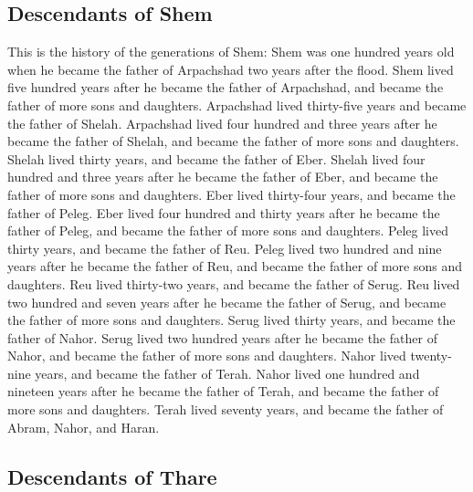 \hypertarget{descendants-of-shem}{%
\subsection{Descendants of Shem}\label{descendants-of-shem}}

 This is the history of the generations of Shem: Shem was
one hundred years old when he became the father of Arpachshad two years
after the flood.  Shem lived five hundred years after he
became the father of Arpachshad, and became the father of more sons and
daughters.  Arpachshad lived thirty-five years and became
the father of Shelah.  Arpachshad lived four hundred and
three years after he became the father of Shelah, and became the father
of more sons and daughters.  Shelah lived thirty years,
and became the father of Eber.  Shelah lived four hundred
and three years after he became the father of Eber, and became the
father of more sons and daughters.  Eber lived
thirty-four years, and became the father of Peleg.  Eber
lived four hundred and thirty years after he became the father of Peleg,
and became the father of more sons and daughters.  Peleg
lived thirty years, and became the father of Reu.  Peleg
lived two hundred and nine years after he became the father of Reu, and
became the father of more sons and daughters.  Reu lived
thirty-two years, and became the father of Serug.  Reu
lived two hundred and seven years after he became the father of Serug,
and became the father of more sons and daughters.  Serug
lived thirty years, and became the father of Nahor. 
Serug lived two hundred years after he became the father of Nahor, and
became the father of more sons and daughters.  Nahor
lived twenty-nine years, and became the father of Terah. 
Nahor lived one hundred and nineteen years after he became the father of
Terah, and became the father of more sons and daughters. 
Terah lived seventy years, and became the father of Abram, Nahor, and
Haran.

\hypertarget{descendants-of-thare}{%
\subsection{Descendants of Thare}\label{descendants-of-thare}}

